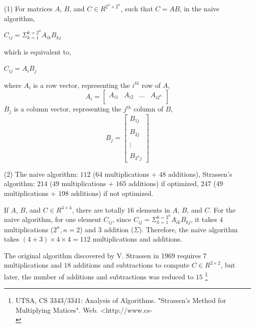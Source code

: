 \documentclass[11pt]{article}
\begin{document}

\setcounter{page}{7}

\begin{solution}

\item (1) For matrices $A$, $B$, and $C \in R^{2^n\times2^n}$, such that $C = AB$, in the naive algorithm,
\begin{center}
$C_{ij} = \Sigma_{k = 1}^{k = 2^n} A_{ik} B_{kj}$
\end{center}
which is equivalent to, 
\begin{center}
$C_{ij} = A_{i} B_{j}$
\end{center}
where $A_{i}$ is a row vector, representing the $i^{th}$ row of $A$, 
\[ A_{i} = 
\begin{bmatrix}
    A_{i1} & A_{i2} & \dots  & A_{i2^n} \\
\end{bmatrix}
\]
$B_{j}$ is a column vector, representing the $j^{th}$ column of $B$, 
\[ B_{j} = 
\begin{bmatrix}
    B_{1j}  \\
\\
 B_{2j} \\
\\
 \vdots  \\
\\
 B_{2^nj} 
\end{bmatrix}
\]
\item (2) The naive algorithm: $112$ ($64$ multiplications + $48$ additions), Strassen's algorithm: $214$ ($49$ multiplications + $165$ additions) if optimized, $247$ ($49$ multiplications + $198$ additions) if not optimized.
\item If $A$, $B$, and $C \in R^{4\times4}$, there are totally $16$ elements in $A$, $B$, and $C$. For the naive algorithm, for one element $C_{ij}$, since $C_{ij} = \Sigma_{k = 1}^{k = 2^n} A_{ik} B_{kj}$, it takes $4$ multiplications ($2^n, n = 2$) and $3$ addition ($\Sigma$). Therefore, the naive algorithm takes $(4+3) \times 4 \times 4 = 112$ multiplications and additions.
\item The original algorithm discovered by V. Strassen in 1969 requires $7$ multiplications and $18$ additions and subtractions to compute $C \in R^{2\times2}$, but later, the number of additions and subtractions was reduced to $15$ \footnote{UTSA, CS 3343/3341: Analysis of Algorithms. "Strassen's Method for Multiplying Matices". Web. <http://www.cs-\\
}
\end{solution}
\end{document}
